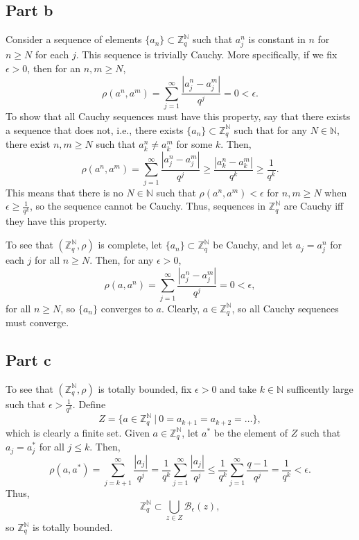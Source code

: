 \documentclass{article}
\begin{document}
\subsection{Part b}
Consider a sequence of elements $\{a_n\}\subset\mathbb{Z}^\mathbb{N}_q$ such that $a_j^n$ is constant in $n$ for $n\geq N$ for each $j$. This sequence is trivially Cauchy. More specifically, if we fix $\epsilon>0$, then for an $n,m\geq N$, 
\[
\rho(a^n,a^m)=\sum_{j=1}^\infty\frac{|a^n_j-a^m_j|}{q^j}=0<\epsilon.
\]
To show that all Cauchy sequences must have this property, say that there exists a sequence that does not, i.e., there exists $\{a_n\}\subset\mathbb{Z}^\mathbb{N}_q$ such that for any $N\in\mathbb{N}$, there exist $n,m\geq N$ such that $a^n_k\neq a^m_k$ for some $k$. Then, 
\[
\rho(a^n,a^m)=\sum_{j=1}^\infty\frac{|a^n_j-a^m_j|}{q^j}\geq\frac{|a^n_k-a^m_k|}{q^k}\geq\frac{1}{q^k}.
\]
This means that there is no $N\in\mathbb{N}$ such that $\rho(a^n,a^m)<\epsilon$ for $n,m\geq N$ when $\epsilon\geq\frac{1}{q^k}$, so the sequence cannot be Cauchy. Thus, sequences in $\mathbb{Z}^\mathbb{N}_q$ are Cauchy iff they have this property.

To see that $(\mathbb{Z}^\mathbb{N}_q,\rho)$ is complete, let $\{a_n\}\subset\mathbb{Z}^\mathbb{N}_q$ be Cauchy, and let $a_j=a^n_j$ for each $j$ for all $n\geq N$. Then, for any $\epsilon>0$,
\[
\rho(a,a^n)=\sum_{j=1}^\infty\frac{|a^n_j-a^m_j|}{q^j}=0<\epsilon,
\]
for all $n\geq N$, so $\{a_n\}$ converges to $a$. Clearly, $a\in\mathbb{Z}^\mathbb{N}_q$, so all Cauchy sequences must converge.

\subsection{Part c}
To see that $(\mathbb{Z}^\mathbb{N}_q,\rho)$ is totally bounded, fix $\epsilon>0$ and take $k\in\mathbb{N}$ sufficently large such that $\epsilon>\frac{1}{q^k}$. Define
\[
Z=\{a\in\mathbb{Z}^\mathbb{N}_q~|~0=a_{k+1}=a_{k+2}=\ldots\},
\]
which is clearly a finite set. Given $a\in\mathbb{Z}^\mathbb{N}_q$, let $a^*$ be the element of $Z$ such that $a_j=a^*_j$ for all $j\leq k$. Then,
\begin{equation*}
\rho(a,a^*)=\sum_{j=k+1}^\infty\frac{|a_j|}{q^j}=\frac{1}{q^k}\sum_{j=1}^\infty\frac{|a_j|}{q^j}\leq\frac{1}{q^k}\sum_{j=1}^\infty\frac{q-1}{q^j}=\frac{1}{q^k}<\epsilon.
\end{equation*}
Thus, 
\[
\mathbb{Z}^\mathbb{N}_q\subset\bigcup_{z\in Z}\mathcal{B}_\epsilon(z),
\]
so $\mathbb{Z}^\mathbb{N}_q$ is totally bounded.
\end{document}
